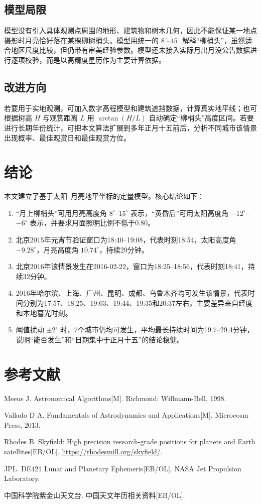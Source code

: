 \documentclass[UTF8,a4paper,12pt]{ctexart}
\begin{document}
\subsection{模型局限}
模型没有引入具体观测点周围的地形、建筑物和树木几何，因此不能保证某一地点摄影时月亮恰好落在某棵柳树梢头。模型用统一的 $8^\circ$--$15^\circ$ 解释“柳梢头”，虽然适合地区尺度比较，但仍带有审美经验参数。模型还未接入实际月出月没公告数据进行逐项校验，而是以高精度星历作为主要计算依据。

\subsection{改进方向}
若要用于实地观测，可加入数字高程模型和建筑遮挡数据，计算真实地平线；也可根据树高 $H$ 与观赏距离 $L$ 用 $\arctan(H/L)$ 自动确定“柳梢头”高度区间。若要进行长期年份统计，可把本文算法扩展到多年正月十五前后，分析不同城市该情景出现概率、最佳观赏日和最佳观赏方位。

\section{结论}
本文建立了基于太阳--月亮地平坐标的定量模型。核心结论如下：
\begin{enumerate}
\item “月上柳梢头”可用月亮高度角 $8^\circ$--$15^\circ$ 表示，“黄昏后”可用太阳高度角 $-12^\circ$--$-6^\circ$ 表示，并要求月面照明比例不低于0.80。
\item 北京2015年元宵节验证窗口为18:40--19:08，代表时刻18:54，太阳高度角 $-9.28^\circ$，月亮高度角 $10.74^\circ$，持续29分钟。
\item 北京2016年该情景发生在2016-02-22，窗口为18:25--18:56，代表时刻18:41，持续32分钟。
\item 2016年哈尔滨、上海、广州、昆明、成都、乌鲁木齐均可发生该情景，代表时间分别为17:57、18:25、19:03、19:44、19:35和20:37左右，主要差异来自经度和本地暮光时刻。
\item 阈值扰动 $\pm2^\circ$ 时，7个城市仍均可发生，平均最长持续时间为19.7--29.4分钟，说明“能否发生”和“日期集中于正月十五”的结论稳健。
\end{enumerate}

\section*{参考文献}
\begin{enumerate}[label={[\arabic*]}]
\item Meeus J. Astronomical Algorithms[M]. Richmond: Willmann-Bell, 1998.
\item Vallado D A. Fundamentals of Astrodynamics and Applications[M]. Microcosm Press, 2013.
\item Rhodes B. Skyfield: High precision research-grade positions for planets and Earth satellites[EB/OL]. \url{https://rhodesmill.org/skyfield/}.
\item JPL. DE421 Lunar and Planetary Ephemeris[EB/OL]. NASA Jet Propulsion Laboratory.
\item 中国科学院紫金山天文台. 中国天文年历相关资料[EB/OL].
\end{enumerate}
\end{document}
